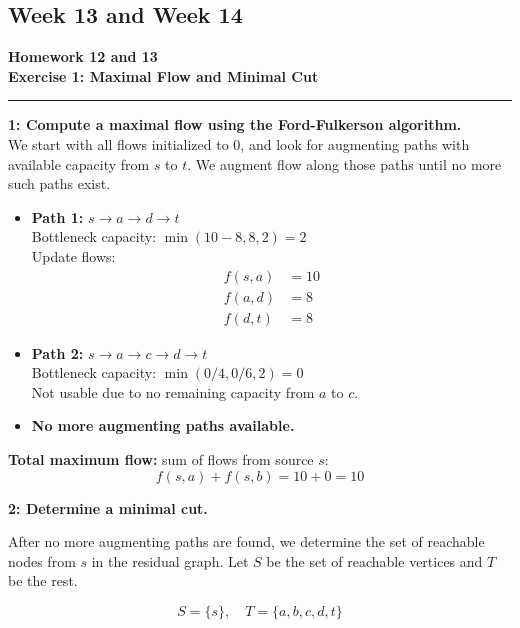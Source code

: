 \documentclass{article}
\theoremstyle{theorem}
\theoremstyle{definition}
\theoremstyle{remark}
\begin{document}
\subsection{Week 13 and Week 14}
\textbf{Homework 12 and 13}\\
\textbf{Exercise 1: Maximal Flow and Minimal Cut} \\
\vspace{0.5em}
\hrule
\vspace{0.5em}
\textbf{1: Compute a maximal flow using the Ford-Fulkerson algorithm.}\\
We start with all flows initialized to 0, and look for augmenting paths with available capacity from $s$ to $t$. We augment flow along those paths until no more such paths exist.

\begin{itemize}
    \item \textbf{Path 1:} $s \rightarrow a \rightarrow d \rightarrow t$ \\
    Bottleneck capacity: $\min(10 - 8, 8, 2) = 2$ \\
    Update flows: 
    \begin{align*}
        f(s,a) & = 10 \\
        f(a,d) & = 8 \\
        f(d,t) & = 8
    \end{align*}

    \item \textbf{Path 2:} $s \rightarrow a \rightarrow c \rightarrow d \rightarrow t$ \\
    Bottleneck capacity: $\min(0/4, 0/6, 2) = 0$ \\
    Not usable due to no remaining capacity from $a$ to $c$.

    \item \textbf{No more augmenting paths available.}
\end{itemize}

\textbf{Total maximum flow:} sum of flows from source $s$:
\[
f(s,a) + f(s,b) = 10 + 0 = \boxed{10}
\]

\vspace{0.5em}

\textbf{2: Determine a minimal cut.}

After no more augmenting paths are found, we determine the set of reachable nodes from $s$ in the residual graph. Let $S$ be the set of reachable vertices and $T$ be the rest.

\[
S = \{s\}, \quad T = \{a, b, c, d, t\}
\]
\end{document}
